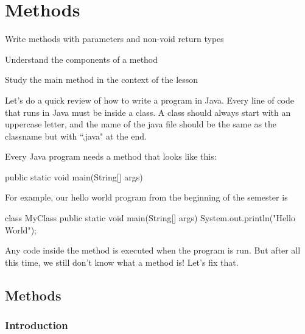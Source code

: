 \chapter{Methods}\label{ch:methods}

\begin{goals}
\item Write methods with parameters and non-void return types
\item Understand the components of a method
\item Study the main method in the context of the lesson
\end{goals}



Let's do a quick review of how to write a program in Java. Every line of code that runs in Java must be inside a class. A class should always start with an uppercase letter, and the name of the java file should be the same as the classname but with ``.java" at the end. 

Every Java program needs a  method that looks like this:

\begin{code}
public static void main(String[] args)
\end{code}

For example, our hello world program from the beginning of the semester is 

\begin{code}
class MyClass {
  public static void main(String[] args) {
    System.out.println("Hello World");
  }
}
\end{code}

Any code inside the  method is executed when the program is run. But after all this time, we still don't know what a method is! Let's fix that. 

\section{Methods}

\subsection{Introduction}

